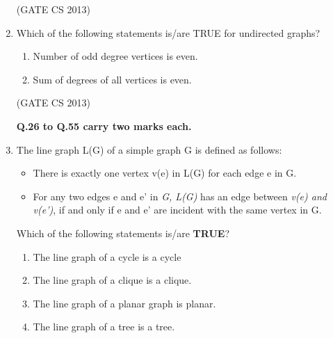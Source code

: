 \documentclass[a4paper, 11pt]{article}
\begin{document}
\begin{enumerate}
    \hfill (GATE CS 2013)

    \item Which of the following statements is/are TRUE for undirected graphs? 
    
    \begin{enumerate}[label=\Alph*., start=16]
        \item Number of odd degree vertices is even.
        \item Sum of degrees of all vertices is even.
    \end{enumerate}
    
    \begin{enumerate}
    \end{enumerate}
    \hfill (GATE CS 2013)

     \large\textbf{Q.26 to Q.55 carry two marks each.}\\
     \item The line graph L(G) of a simple graph G is defined as follows: 
     \begin{itemize}
         \item There is exactly one vertex v(e) in L(G) for each edge e in G. 
         \item For any two edges e and e' in \textit{G, L(G)} has an edge between \textit{v(e) and v(e')}, if and only if e and e' are incident with the same vertex in G. 
     \end{itemize}
     Which of the following statements is/are \textbf{TRUE}?
     \begin{enumerate}[label=(\Alph*), start=16]
         \item The line graph of a cycle is a cycle
         \item The line graph of a clique is a clique. 
         \item  The line graph of a planar graph is planar.
         \item The line graph of a tree is a tree.
     \end{enumerate}
     \begin{enumerate}
     \end{enumerate}


\end{enumerate}
\end{document}
